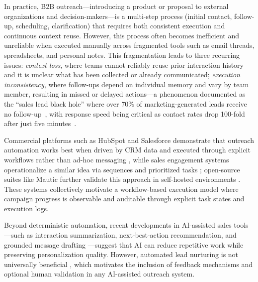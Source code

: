 \documentclass[a4paper]{article}
\begin{document}
In practice, B2B outreach---introducing a product or proposal to 
external organizations and decision-makers---is a multi-step process 
(initial contact, follow-up, scheduling, clarification) that requires 
both consistent execution and continuous context reuse. However, this 
process often becomes inefficient and unreliable when executed manually 
across fragmented tools such as email threads, spreadsheets, and 
personal notes. This fragmentation leads to three recurring issues: 
\emph{context loss}, where teams cannot reliably reuse prior 
interaction history and it is unclear what has been collected or 
already communicated; \emph{execution inconsistency}, where follow-ups 
depend on individual memory and vary by team member, resulting in missed or delayed actions---a phenomenon documented 
as the ``sales lead black hole'' where over 70\% of marketing-generated 
leads receive no follow-up~\cite{sabnis2013sales}, with response 
speed being critical as contact rates drop 100-fold after just 
five minutes~\cite{jarvinen2016marketingautomation}.

Commercial platforms such as HubSpot and Salesforce demonstrate that 
outreach automation works best when driven by CRM data and executed 
through explicit workflows rather than ad-hoc messaging 
\cite{hubspot_marketing_automation,salesforce_journey_builder_pdf}, 
while sales engagement systems operationalize a similar idea via 
sequences and prioritized tasks \cite{outreach_sales_engagement}; 
open-source suites like Mautic further validate this approach in 
self-hosted environments \cite{mautic_docs}. These systems 
collectively motivate a workflow-based execution model where campaign 
progress is observable and auditable through explicit task states 
and execution logs.

Beyond deterministic automation, recent developments in AI-assisted 
sales tools---such as interaction summarization, next-best-action 
recommendation, and grounded message drafting 
\cite{hubspot_ai_email_creation,ms_d365_copilot_overview,
salesforce_nba_about}---suggest that AI can reduce repetitive work 
while preserving personalization quality. However, automated lead 
nurturing is not universally beneficial 
\cite{habel2025aln,jarvinen2016marketingautomation}, which 
motivates the inclusion of feedback mechanisms and optional human 
validation in any AI-assisted outreach system.
\end{document}
